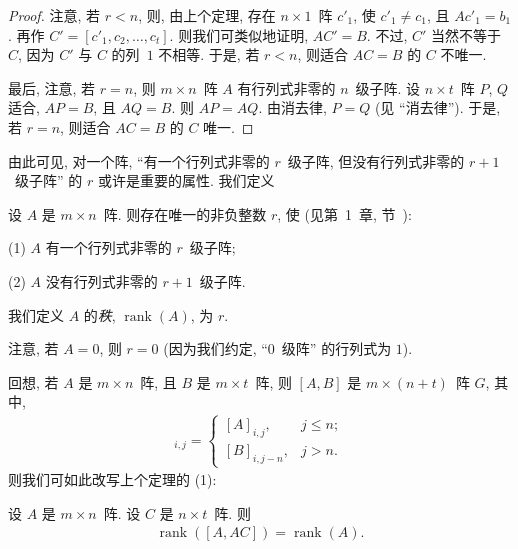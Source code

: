 \documentclass[../libro.tex]{subfiles}
\begin{document}
\begin{proof}
    注意, 若 \(r < n\),
    则, 由上个定理,
    存在 \(n \times 1\)~阵 \(c'_1\),
    使 \(c'_1 \neq c_1\),
    且 \(A c'_1 = b_1\).
    再作 \(C' = [c'_1, c_2, \dots, c_t]\).
    则我们可类似地证明, \(A C' = B\).
    不过, \(C'\) 当然不等于 \(C\),
    因为 \(C'\) 与 \(C\) 的列~\(1\) 不相等.
    于是, 若 \(r < n\), 则适合 \(A C = B\)
    的 \(C\) 不唯一.

    最后, 注意, 若 \(r = n\),
    则 \(m \times n\)~阵 \(A\)
    有行列式非零的 \(n\)~级子阵.
    设 \(n \times t\)~阵 \(P\), \(Q\) 适合,
    \(A P = B\), 且 \(A Q = B\).
    则 \(A P = A Q\).
    由消去律, \(P = Q\)
    (见 ``消去律'').
    于是, 若 \(r = n\), 则适合 \(A C = B\)
    的 \(C\) 唯一.
\end{proof}

由此可见, 对一个阵,
``有一个行列式非零的 \(r\)~级子阵,
但没有行列式非零的 \(r+1\)~级子阵''
的 \(r\) 或许是重要的属性.
我们定义

\begin{definition}
    设 \(A\) 是 \(m \times n\)~阵.
    则存在唯一的非负整数 \(r\),
    使
    (见第~1~章, 节~):

    (1)
    \(A\) 有一个行列式非零的 \(r\)~级子阵;

    (2)
    \(A\) 没有行列式非零的 \(r+1\)~级子阵.

    我们定义 \(A\) 的\emph{秩},
    \(\operatorname{rank} {(A)}\),
    为 \(r\).

    注意, 若 \(A = 0\), 则 \(r = 0\)
    (因为我们约定, ``\(0\)~级阵'' 的行列式为 \(1\)).
\end{definition}

回想, 若 \(A\) 是 \(m \times n\)~阵,
且 \(B\) 是 \(m \times t\)~阵,
则 \([A, B]\) 是 \(m \times (n + t)\)~阵 \(G\),
其中,
\begin{align*}
    [G]_{i,j} =
    \begin{cases}
        [A]_{i,j},   & j \leq n; \\
        [B]_{i,j-n}, & j > n.
    \end{cases}
\end{align*}
则我们可如此改写上个定理的 (1):

\begin{theorem}
    设 \(A\) 是 \(m \times n\)~阵.
    设 \(C\) 是 \(n \times t\)~阵.
    则
    \begin{align*}
        \operatorname{rank} {([A, AC])}
        = \operatorname{rank} {(A)}.
    \end{align*}
\end{theorem}
\end{document}

